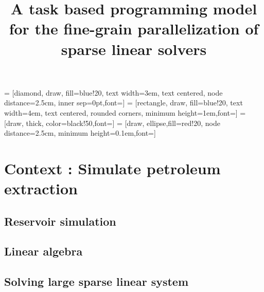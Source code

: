 \documentclass[oneside,12t]{classes/Thesis}
\title{A task based programming model for the fine-grain parallelization of sparse linear solvers}
\begin{document}
\dominitoc
{} = [diamond, draw, fill=blue!20,
text width=3em, text centered, node distance=2.5cm, inner sep=0pt,font=\scriptsize]
 = [rectangle, draw, fill=blue!20,
text width=4em, text centered, rounded corners, minimum height=1em,font=\scriptsize]
 = [draw, thick, color=black!50,font=\scriptsize]
 = [draw, ellipse,fill=red!20, node distance=2.5cm,
minimum height=0.1em,font=\scriptsize]

\maketitle

\setcounter{secnumdepth}{3}
\setcounter{tocdepth}{3}

\frontmatter %
%
%
%
\tableofcontents
\mtcaddchapter
\mainmatter %



\chapter{Context : Simulate petroleum extraction}
\minitoc
\vspace{1cm}

\section{Reservoir simulation}




\section{Linear algebra}




\section{Solving large sparse linear system}


\end{document}
